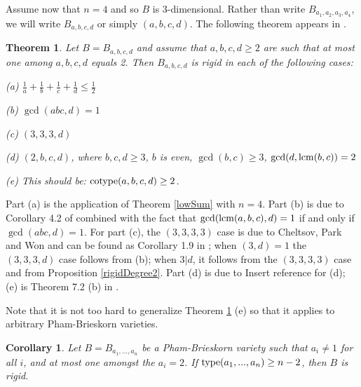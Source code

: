 \documentclass[12pt]{amsart}
\theoremstyle{plain}
\newcommand{\red}{\color{red}}
\newtheorem{theorem}[subsection]{Theorem}
\newtheorem{corollary}[subsection]{Corollary}
\theoremstyle{definition}
\newcommand{\lcm}{		\operatorname{{\rm lcm}}}
\newcommand{\type}{		\operatorname{{\rm type}}}
\newcommand{\cotype}{		\operatorname{{\rm cotype}}}
\begin{document}
	Assume now that $n=4$ and so $B$ is 3-dimensional. Rather than write $B_{a_1,a_2,a_3,a_4}$, we will write $B_{a,b,c,d}$ or simply $(a,b,c,d)$. The following theorem appears in \cite{LNDsAbelianGroup}.    
	
	\begin{theorem} \label{collection}
		Let $B = B_{a,b,c,d}$ and assume that $a,b,c,d \geq 2$ are such that at most one among $a,b,c,d$ equals 2. Then $B_{a,b,c,d}$ is rigid in each of the following cases:
		
		(a)  $\frac{1}{a} + \frac{1}{b} + \frac{1}{c} + \frac{1}{d} \leq \frac{1}{2}$
		
		(b) $\gcd(abc,d) = 1$
		
		(c) $(3,3,3,d)$
		
		(d) $(2,b,c,d)$, where $b,c,d \geq 3$, $b$ is even, $\gcd(b,c) \geq 3$, $\gcd(d,\lcm(b,c)) = 2$
		
		(e) \xout{$\type(a,b,c,d) \geq 2$} {\rm\red This should be: $\cotype(a,b,c,d) \ge 2$.}
	\end{theorem}
	
	Part (a) is the application of Theorem \ref{lowSum} with $n=4$. Part (b) is due to Corollary 4.2 of \cite{freudenburg2013} combined with the fact that $\gcd(\lcm(a,b,c),d) = 1$ if and only if $\gcd(abc,d) = 1$. For part (c), the $(3,3,3,3)$ case is due to Cheltsov, Park and Won and can be found as Corollary 1.9 in \cite{affineCones}; when $(3,d) = 1$ the $(3,3,3,d)$ case follows from (b); when $3|d$, it follows from the $(3,3,3,3)$ case and from Proposition \ref{rigidDegree2}. Part (d) is due to {\red Insert reference for (d)}; (e) is Theorem 7.2 (b) in \cite{LNDsAbelianGroup}.
	
	Note that it is not too hard to generalize Theorem \ref{collection} (e) so that it applies to arbitrary Pham-Brieskorn varieties. 
	
	\begin{corollary}
		Let $B = B_{a_1,...,a_n}$ be a Pham-Brieskorn variety such that $a_i \neq 1$ for all $i$, and at most one amongst the $a_i = 2$. If $\type(a_1,...,a_n) \geq n-2$, then $B$ is rigid.  
	\end{corollary}
	
\end{document}
